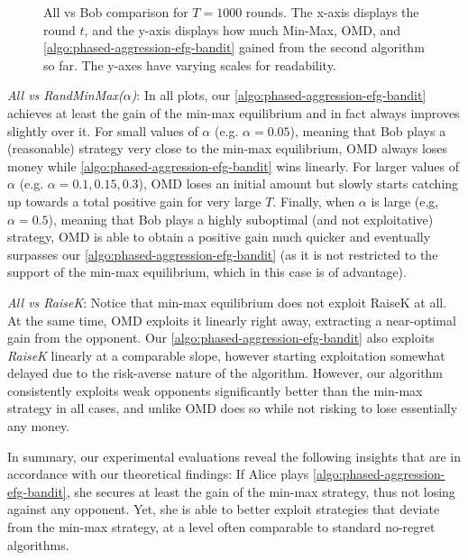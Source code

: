 \begin{figure*}[ht]
\begin{minipage}{1.0\textwidth}
\begin{minipage}{0.05\textwidth}
    \end{minipage}
    \begin{minipage}{1.0\textwidth}
    \centering
    \vspace{0.4cm}
    \caption{All vs Bob comparison for $T=1000$ rounds. The x-axis displays the round $t$, and the y-axis displays how much {\color{mblue}Min-Max}, {\color{mred}OMD}, and {\color{mgreen}\cref{algo:phased-aggression-efg-bandit}} gained from the second algorithm so far. The y-axes have varying scales for readability.}\label{fig:all-vs-x2} \vspace{-0.4cm}
    \end{minipage}
    \end{minipage}
\end{figure*}

\emph{All vs RandMinMax($\alpha$)}: In all plots, our \cref{algo:phased-aggression-efg-bandit} achieves at least the gain of the min-max equilibrium and in fact always improves slightly over it. For small values of $\alpha$ (e.g. $\alpha=0.05$), meaning that Bob plays a (reasonable) strategy very close to the min-max equilibrium, OMD always loses money while \cref{algo:phased-aggression-efg-bandit} wins linearly. For larger values of $\alpha$ (e.g. $\alpha=0.1, 0.15,0.3$), OMD loses an initial amount but slowly starts catching up towards a total positive gain for very large $T$. Finally, when $\alpha$ is large (e,g, $\alpha=0.5$), meaning that Bob plays a highly suboptimal (and not exploitative) strategy, OMD is able to obtain a positive gain much quicker and eventually surpasses our \cref{algo:phased-aggression-efg-bandit} (as it is not restricted to the support of the min-max equilibrium, which in this case is of advantage). 

\emph{All vs RaiseK}: Notice that min-max equilibrium does not exploit RaiseK at all. At the same time, OMD exploits it linearly right away, extracting a near-optimal gain from the opponent. Our \cref{algo:phased-aggression-efg-bandit} also exploits \emph{RaiseK} linearly at a comparable slope, however starting exploitation somewhat delayed due to the risk-averse nature of the algorithm. However, our algorithm consistently exploits weak opponents significantly better than the min-max strategy in all cases, and unlike OMD does so while not risking to lose essentially any money.

In summary, our experimental evaluations reveal the following insights that are in accordance with our theoretical findings: If Alice plays \cref{algo:phased-aggression-efg-bandit}, she secures at least the gain of the min-max strategy, thus not losing against any opponent. Yet, she is able to better exploit strategies that deviate from the min-max strategy, at a level often comparable to standard no-regret algorithms.

